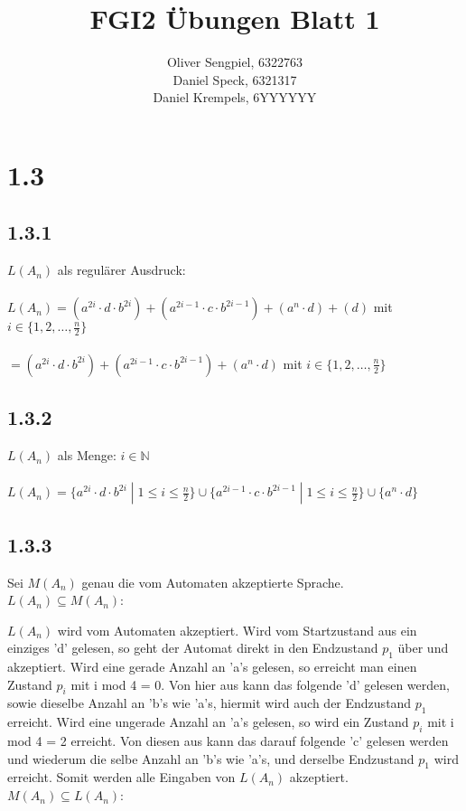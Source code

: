 \documentclass{article}
\title{FGI2 Übungen Blatt 1}
\author{Oliver Sengpiel, 6322763 \\ Daniel Speck, 6321317 \\ Daniel
Krempels, 6YYYYYY}
\begin{document}
\maketitle
\section*{1.3}
\subsection*{1.3.1} 
$L(A_n)$ als regulärer Ausdruck:
\\
\\
$L(A_n) = (a^{2i}\cdot d\cdot b^{2i}) + (a^{2i-1}\cdot c\cdot
b^{2i-1}) + (a^{n}\cdot d) + (d)$ mit $i \in \{1, 2, \dots, \frac{n}{2}
\}$
\\
\\
$= (a^{2i}\cdot d\cdot b^{2i}) + (a^{2i-1}\cdot c\cdot
b^{2i-1}) + (a^{n}\cdot d)$ mit $i \in \{1, 2, \dots, \frac{n}{2}
\}$

\subsection*{1.3.2}
$L(A_n)$ als Menge: \hfill $i \in \mathbb{N}$
\\
\\
$L(A_n) = \{ a^{2i} \cdot d \cdot b^{2i} \;|\; 1 \leq i \leq \frac{n}{2} \}
\cup
\{ a^{2i-1} \cdot c \cdot b^{2i-1} \;|\; 1 \leq i \leq \frac{n}{2} \}
\cup
\{ a^n \cdot d \}$

\subsection*{1.3.3}
Sei $M(A_n)$ genau die vom Automaten akzeptierte Sprache. \\ $L(A_n)
\subseteq M(A_n)$: 

$L(A_n)$ wird vom Automaten akzeptiert. Wird vom Startzustand aus
ein einziges 'd' gelesen, so geht der Automat direkt in den
Endzustand $p_1$ über und akzeptiert. Wird eine gerade Anzahl an
'a's gelesen, so erreicht man einen Zustand $p_i$ mit i mod 4 = 0.
Von hier aus kann das folgende 'd' gelesen werden, sowie dieselbe
Anzahl an 'b's wie 'a's, hiermit wird auch der Endzustand $p_1$
erreicht. Wird eine ungerade Anzahl an 'a's gelesen, so wird ein
Zustand $p_i$ mit i mod 4 = 2 erreicht. Von diesen aus kann das
darauf folgende 'c' gelesen werden und wiederum die selbe Anzahl an
'b's wie 'a's, und derselbe Endzustand $p_1$ wird erreicht. Somit
werden alle Eingaben von $L(A_n)$ akzeptiert. \\ $M(A_n) \subseteq
L(A_n)$: 
\end{document}
